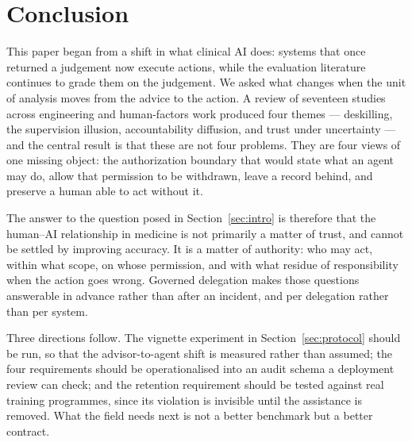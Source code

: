 \section{Conclusion}
\label{sec:conclusion}

This paper began from a shift in what clinical AI does: systems that once returned a judgement now execute actions, while the evaluation literature continues to grade them on the judgement. We asked what changes when the unit of analysis moves from the advice to the action. A review of seventeen studies across engineering and human-factors work produced four themes --- deskilling, the supervision illusion, accountability diffusion, and trust under uncertainty --- and the central result is that these are not four problems. They are four views of one missing object: the authorization boundary that would state what an agent may do, allow that permission to be withdrawn, leave a record behind, and preserve a human able to act without it.

The answer to the question posed in Section~\ref{sec:intro} is therefore that the human--AI relationship in medicine is not primarily a matter of trust, and cannot be settled by improving accuracy. It is a matter of authority: who may act, within what scope, on whose permission, and with what residue of responsibility when the action goes wrong. Governed delegation makes those questions answerable in advance rather than after an incident, and per delegation rather than per system.

Three directions follow. The vignette experiment in Section~\ref{sec:protocol} should be run, so that the advisor-to-agent shift is measured rather than assumed; the four requirements should be operationalised into an audit schema a deployment review can check; and the retention requirement should be tested against real training programmes, since its violation is invisible until the assistance is removed. What the field needs next is not a better benchmark but a better contract.
